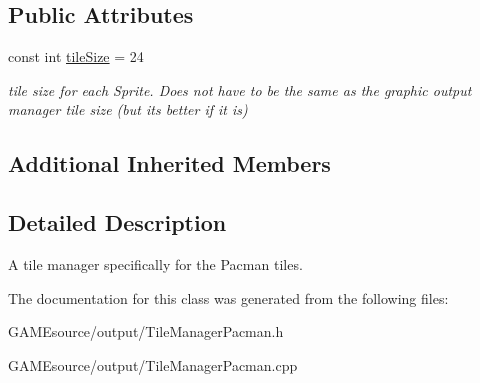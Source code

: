 \subsection*{Public Attributes}
\begin{DoxyCompactItemize}
\item 
\mbox{\label{class_tile_manager_pacman_ab5bc2042c7f10d1aef3757607722648a}} 
const int \mbox{\hyperlink{class_tile_manager_pacman_ab5bc2042c7f10d1aef3757607722648a}{tile\+Size}} = 24
\begin{DoxyCompactList}\small\item\em tile size for each Sprite. Does not have to be the same as the graphic output manager tile size (but it\textquotesingle{}s better if it is) \end{DoxyCompactList}\end{DoxyCompactItemize}
\subsection*{Additional Inherited Members}


\subsection{Detailed Description}
A tile manager specifically for the Pacman tiles. 

The documentation for this class was generated from the following files\+:\begin{DoxyCompactItemize}
\item 
G\+A\+M\+Esource/output/Tile\+Manager\+Pacman.\+h\item 
G\+A\+M\+Esource/output/Tile\+Manager\+Pacman.\+cpp\end{DoxyCompactItemize}
